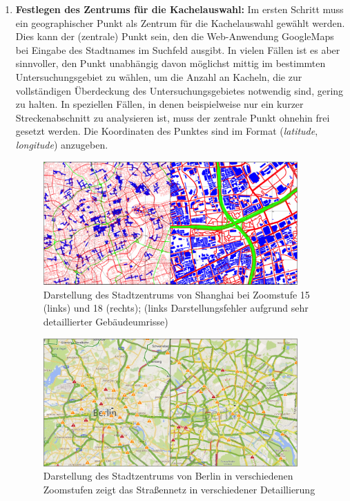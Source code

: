 \begin{enumerate}
\item \textbf{Festlegen des Zentrums für die Kachelauswahl:} Im ersten Schritt muss ein geographischer Punkt als Zentrum für die Kachelauswahl gewählt werden. Dies kann der (zentrale) Punkt sein, den die Web-Anwendung GoogleMaps bei Eingabe des Stadtnames im Suchfeld ausgibt. In vielen Fällen ist es aber sinnvoller, den Punkt unabhängig davon möglichst mittig im bestimmten  Untersuchungsgebiet zu wählen, um die Anzahl an Kacheln, die zur vollständigen Überdeckung des Untersuchungsgebietes notwendig sind, gering zu halten. In speziellen Fällen, in denen beispielweise nur ein kurzer Streckenabschnitt zu analysieren ist, muss der zentrale Punkt ohnehin frei gesetzt werden. Die Koordinaten des Punktes sind im Format (\textit{latitude}, \textit{longitude}) anzugeben.

\begin{figure}
  \centering
    \includegraphics[width=0.92\textwidth]{images/3_Shanghai_Problem_Datenaufloesung}
    \caption{Darstellung des Stadtzentrums von Shanghai bei Zoomstufe 15 (links) und 18 (rechts); (links Darstellungsfehler aufgrund sehr detaillierter Gebäudeumrisse)}
    \label{fig:Fehler_Shanghai}
\end{figure}

\begin{figure}
  \centering
    \includegraphics[width=0.92\textwidth]{images/3_bing_Aufloesung_traffic}
    \caption{Darstellung des Stadtzentrums von Berlin in verschiedenen Zoomstufen zeigt das Straßennetz in verschiedener Detaillierung}
    \label{fig:Fehler_Berlin}
\end{figure}


\end{enumerate}
